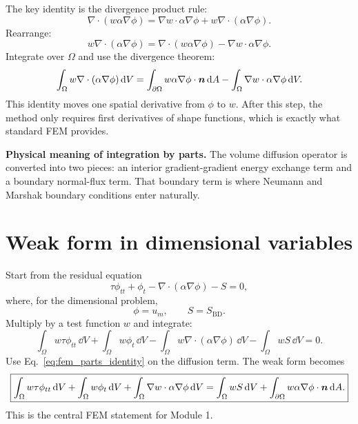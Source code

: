 \documentclass[11pt]{article}
\begin{document}
The key identity is the divergence product rule:
\begin{equation}
    \nabla\cdot(w\alpha\nabla\phi)
    =\nabla w\cdot\alpha\nabla\phi+w\nabla\cdot(\alpha\nabla\phi).
\end{equation}
Rearrange:
\begin{equation}
    w\nabla\cdot(\alpha\nabla\phi)
    =\nabla\cdot(w\alpha\nabla\phi)-\nabla w\cdot\alpha\nabla\phi.
\end{equation}
Integrate over \(\Omega\) and use the divergence theorem:
\begin{equation}
    \int_\Omega w\nabla\cdot(\alpha\nabla\phi)\,\dd V
    =\int_{\partial\Omega} w\alpha\nabla\phi\cdot\bm{n}\,\dd A
    -\int_\Omega \nabla w\cdot\alpha\nabla\phi\,\dd V.
    \label{eq:fem_parts_identity}
\end{equation}
This identity moves one spatial derivative from \(\phi\) to \(w\). After this step, the method only requires first derivatives of shape functions, which is exactly what standard FEM provides.

\begin{physicsbox}
\textbf{Physical meaning of integration by parts.} The volume diffusion operator is converted into two pieces: an interior gradient-gradient energy exchange term and a boundary normal-flux term. That boundary term is where Neumann and Marshak boundary conditions enter naturally.
\end{physicsbox}

\section{Weak form in dimensional variables}
Start from the residual equation
\begin{equation}
    \tau\phi_{tt}+\phi_t-\nabla\cdot(\alpha\nabla\phi)-S=0,
    \label{eq:fem_generic_strong}
\end{equation}
where, for the dimensional problem,
\begin{equation}
    \phi=u_m,
    \qquad
    S=S_{\mathrm{BD}}.
\end{equation}
Multiply by a test function \(w\) and integrate:
\begin{equation}
    \int_\Omega w\tau\phi_{tt}\,\dd V
    +\int_\Omega w\phi_t\,\dd V
    -\int_\Omega w\nabla\cdot(\alpha\nabla\phi)\,\dd V
    -\int_\Omega wS\,\dd V=0.
\end{equation}
Use Eq.~\eqref{eq:fem_parts_identity} on the diffusion term. The weak form becomes
\begin{equation}
    \boxed{
    \int_\Omega w\tau\phi_{tt}\,\dd V
    +\int_\Omega w\phi_t\,\dd V
    +\int_\Omega \nabla w\cdot\alpha\nabla\phi\,\dd V
    =\int_\Omega wS\,\dd V
    +\int_{\partial\Omega} w\alpha\nabla\phi\cdot\bm{n}\,\dd A.}
    \label{eq:fem_generic_weak}
\end{equation}
This is the central FEM statement for Module 1.
\end{document}
